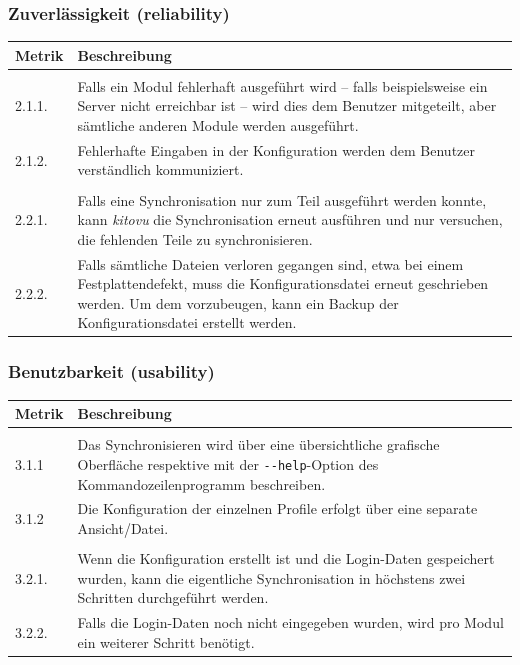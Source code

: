 \documentclass[a4paper]{article}
\begin{document}
\subsubsection{Zuverlässigkeit (reliability)}

\begin{tabulary}{\linewidth}{lL}
  \toprule
  Metrik & Beschreibung \\
  \midrule

   \\
  2.1.1. & Falls ein Modul fehlerhaft ausgeführt wird -- falls beispielsweise ein Server nicht erreichbar ist -- wird dies dem Benutzer mitgeteilt, aber sämtliche anderen Module werden ausgeführt. \\
  2.1.2. & Fehlerhafte Eingaben in der Konfiguration werden dem Benutzer verständlich kommuniziert. \\

   \\
  2.2.1. & Falls eine Synchronisation nur zum Teil ausgeführt werden konnte, kann \emph{kitovu} die Synchronisation erneut ausführen und nur versuchen, die fehlenden Teile zu synchronisieren. \\
  2.2.2. & Falls sämtliche Dateien verloren gegangen sind, etwa bei einem Festplattendefekt, muss die Konfigurationsdatei erneut geschrieben werden. Um dem vorzubeugen, kann ein Backup der Konfigurationsdatei erstellt werden. \\
  \bottomrule
\end{tabulary}

\subsubsection{Benutzbarkeit (usability)}

\begin{tabulary}{\linewidth}{lL}
  \toprule
  Metrik & Beschreibung \\
  \midrule
   \\
  3.1.1 & Das Synchronisieren wird über eine übersichtliche grafische Oberfläche respektive mit der \verb|--help|-Option des Kommandozeilenprogramm beschreiben. \\
  3.1.2 & Die Konfiguration der einzelnen Profile erfolgt über eine separate Ansicht/Datei. \\
   \\
  3.2.1. & Wenn die Konfiguration erstellt ist und die Login-Daten gespeichert wurden, kann die eigentliche Synchronisation in höchstens zwei Schritten durchgeführt werden. \\
  3.2.2. & Falls die Login-Daten noch nicht eingegeben wurden, wird pro Modul ein weiterer Schritt benötigt. \\
  \bottomrule
\end{tabulary}
\end{document}
